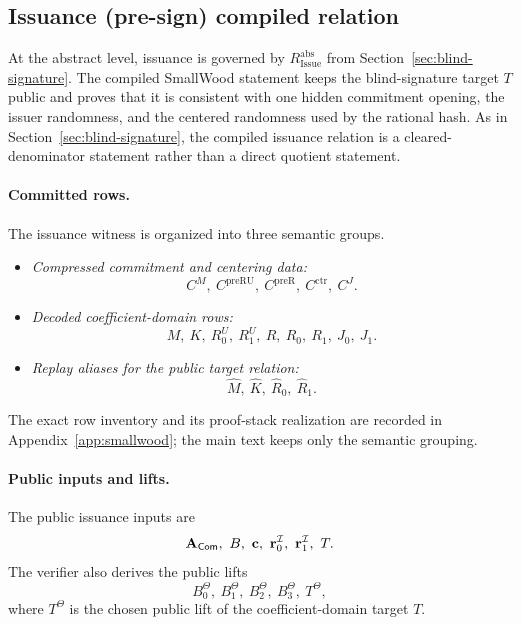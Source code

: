 \subsection{Issuance (pre-sign) compiled relation}
\label{subsec:smallwood-issuance}
\label{subsec:presign-compiled}
At the abstract level, issuance is governed by \(R_{\mathrm{Issue}}^{\mathrm{abs}}\) from
Section~\ref{sec:blind-signature}. The compiled SmallWood statement keeps the blind-signature target \(T\) public and
proves that it is consistent with one hidden commitment opening, the issuer randomness, and the centered randomness used
by the rational hash. As in Section~\ref{sec:blind-signature}, the compiled issuance relation is a cleared-denominator
statement rather than a direct quotient statement.

\paragraph{Committed rows.}
The issuance witness is organized into three semantic groups.
\begin{itemize}[leftmargin=1.25em]
    \item \emph{Compressed commitment and centering data:}
    \[
    C^M,\ C^{\mathrm{preRU}},\ C^{\mathrm{preR}},\ C^{\mathrm{ctr}},\ C^J.
    \]
    \item \emph{Decoded coefficient-domain rows:}
    \[
    M,\ K,\ R_0^U,\ R_1^U,\ R,\ R_0,\ R_1,\ J_0,\ J_1.
    \]
    \item \emph{Replay aliases for the public target relation:}
    \[
    \widehat M,\ \widehat K,\ \widehat R_0,\ \widehat R_1.
    \]
\end{itemize}
The exact row inventory and its proof-stack realization are recorded in Appendix~\ref{app:smallwood}; the main text
keeps only the semantic grouping.

\paragraph{Public inputs and lifts.}
The public issuance inputs are
\[
\mACom,\ B,\ \vecc,\ \vecr_0^{\Issuer},\ \vecr_1^{\Issuer},\ T.
\]
The verifier also derives the public lifts
\[
B_0^\Theta,\ B_1^\Theta,\ B_2^\Theta,\ B_3^\Theta,\ T^\Theta,
\]
where \(T^\Theta\) is the chosen public lift of the coefficient-domain target \(T\).

